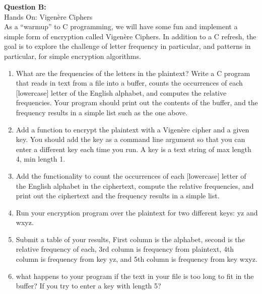 \documentclass[a4paper, 11pt]{article}
\newenvironment{problem}[2][Question]
               { \begin{mdframed}[backgroundcolor=gray!20] \textbf{#1 #2:} \\}
               {   \end{mdframed}}
\begin{document}
 \begin{problem}{B} 
   Hands On: Vigenère Ciphers\\
   As a ``warmup'' to C programming, we will have some fun and implement a simple form of encryption called Vigenère Ciphers. In addition to a C refresh, the goal is to explore the challenge of letter frequency in particular, and patterns in particular, for simple encryption algorithms.

   \begin{enumerate}[label=\arabic*.]
   \item
     What are the frequencies of the letters in the plaintext? Write a C program that reads in text from a file into a buffer, counts the occurrences of each [lowercase] letter of the English alphabet, and computes the relative frequencies. Your program should print out the contents of the buffer, and the frequency results in a simple list such as the one above.
   \item
     Add a function to encrypt the plaintext with a Vigenère cipher and a given key. You should add the key as a command line argument so that you can enter a different key each time you run. A key is a text string of max length 4, min length 1.
   \item
    Add the functionality to count the occurrences of each [lowercase] letter of the English alphabet in the ciphertext, compute the relative frequencies, and print out the ciphertext and the frequency results in a simple list.
  \item
    Run your encryption program over the plaintext for two different keys: yz and wxyz.
  \item
    Submit a table of your results, First column is the alphabet, second is the relative frequency of each, 3rd column is frequency from plaintext, 4th column is frequency from key yz, and 5th column is frequency from key wxyz.
  \item
    what happens to your program if the text in your file is too long to fit in the buffer? If you try to enter a key with length 5?
  \end{enumerate}
  
\end{problem}
\end{document}
